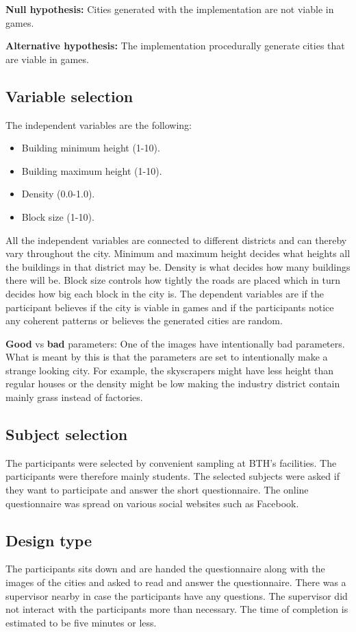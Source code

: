 	\textbf{Null hypothesis:} Cities generated with the implementation are not viable in games.
			
	\textbf{Alternative hypothesis:} The implementation procedurally generate cities that are viable in games.
			
	\subsection{Variable selection}
	The independent variables are the following:
	\begin{itemize}
		\item Building minimum height (1-10).
		\item Building maximum height (1-10).
		\item Density (0.0-1.0).
		\item Block size (1-10).
	\end{itemize}
	All the independent variables are connected to different districts and can thereby vary throughout the city. Minimum and maximum height decides what heights all the buildings in that district may be. Density is what decides how many buildings there will be. Block size controls how tightly the roads are placed which in turn decides how big each block in the city is. The dependent variables are if the participant believes if the city is viable in games and if the participants notice any coherent patterns or believes the generated cities are random.
			
	\textbf{Good} vs \textbf{bad} parameters: One of the images have intentionally bad parameters. What is meant by this is that the parameters are set to intentionally make a strange looking city. For example, the skyscrapers might have less height than regular houses or the density might be low making the industry district contain mainly grass instead of factories.
			
	\subsection{Subject selection}
	The participants were selected by convenient sampling at BTH's facilities. The participants were therefore mainly students. The selected subjects were asked if they want to participate and answer the short questionnaire. The online questionnaire was spread on various social websites such as Facebook.
			
	\subsection{Design type}
	The participants sits down and are handed the questionnaire along with the images of the cities and asked to read and answer the questionnaire. There was a supervisor nearby in case the participants have any questions. The supervisor did not interact with the participants more than necessary.  The time of completion is estimated to be five minutes or less.
			
